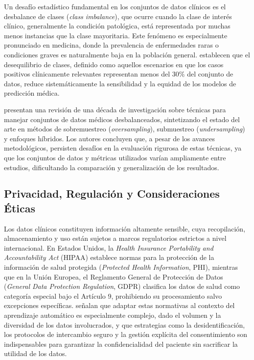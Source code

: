Un desafío estadístico fundamental en los conjuntos de datos clínicos es el desbalance de clases 
(\textit{class imbalance}), que ocurre cuando la clase de interés clínico, generalmente la 
condición patológica, está representada por muchas menos instancias que la clase mayoritaria. 
Este fenómeno es especialmente pronunciado en medicina, donde la prevalencia de enfermedades 
raras o condiciones graves es naturalmente baja en la población general. \textcite{Abdelhay2025} 
establecen que el desequilibrio de clases, definido como aquellos escenarios en que los casos 
positivos clínicamente relevantes representan menos del 30\% del conjunto de datos, reduce 
sistemáticamente la sensibilidad y la equidad de los modelos de predicción médica. 

\textcite{Salmi2024} presentan una revisión de una década de investigación sobre técnicas para 
manejar conjuntos de datos médicos desbalanceados, sintetizando el estado del arte en métodos 
de sobremuestreo (\textit{oversampling}), submuestreo (\textit{undersampling}) y enfoques 
híbridos. Los autores concluyen que, a pesar de los avances metodológicos, persisten desafíos 
en la evaluación rigurosa de estas técnicas, ya que los conjuntos de datos y métricas utilizados 
varían ampliamente entre estudios, dificultando la comparación y generalización de los resultados. 


\subsection{Privacidad, Regulación y Consideraciones Éticas}

Los datos clínicos constituyen información altamente sensible, cuya recopilación, almacenamiento y 
uso están sujetos a marcos regulatorios estrictos a nivel internacional. En Estados Unidos, la 
\textit{Health Insurance Portability and Accountability Act} (HIPAA) establece normas para la 
protección de la información de salud protegida (\textit{Protected Health Information}, PHI), 
mientras que en la Unión Europea, el Reglamento General de Protección de Datos (\textit{General Data Protection Regulation}, GDPR) 
clasifica los datos de salud como categoría especial bajo el Artículo 9, prohibiendo su 
procesamiento salvo excepciones específicas. \textcite{Alhumaidi2025} señalan que adaptar estas 
normativas al contexto del aprendizaje automático es especialmente complejo, dado el volumen 
y la diversidad de los datos involucrados, y que estrategias como la desidentificación, los 
protocolos de intercambio seguro y la gestión explícita del consentimiento son indispensables 
para garantizar la confidencialidad del paciente sin sacrificar la utilidad de los datos.

